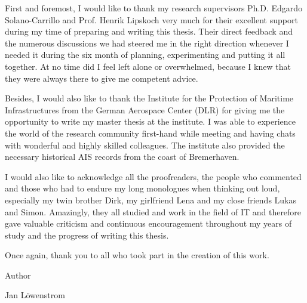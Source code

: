 First and foremost, I would like to thank my research supervisors Ph.D. Edgardo Solano-Carrillo and Prof. Henrik Lipskoch very much for their excellent support during my time of preparing and writing this thesis. Their direct feedback and the numerous discussions we had steered me in the right direction whenever I needed it during the six month of planning, experimenting and putting it all together. At no time did I feel left alone or overwhelmed, because I knew that they were always there to give me competent advice.
\par
Besides, I would also like to thank the Institute for the Protection of Maritime Infrastructures from the German Aerospace Center (DLR) for giving me the opportunity to write my master thesis at the institute. I was able to experience the world of the research community first-hand while meeting and having chats with wonderful and highly skilled colleagues. The institute also provided the necessary historical AIS records from the coast of Bremerhaven.
\par
I would also like to acknowledge all the proofreaders, the people who commented and those who had to endure my long monologues when thinking out loud, especially my twin brother Dirk, my girlfriend Lena and my close friends Lukas and Simon. Amazingly, they all studied and work in the field of IT and therefore gave valuable criticism and continuous encouragement throughout my years of study and the progress of writing this thesis.
\par
Once again, thank you to all who took part in the creation of this work.
\par
Author
\par
Jan Löwenstrom